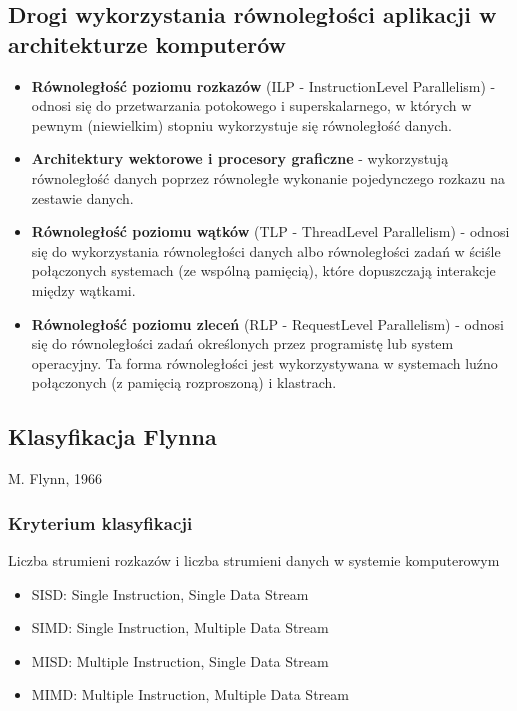 \documentclass[a4paper,twoside]{article}
\begin{document}
		\subsection*{Drogi wykorzystania równoległości aplikacji w architekturze komputerów}
			\begin{itemize}
				\item \textbf{Równoległość poziomu rozkazów} (ILP - InstructionLevel Parallelism) - odnosi się do przetwarzania potokowego i superskalarnego, w których w pewnym (niewielkim) stopniu wykorzystuje się równoległość danych.
				\item \textbf{Architektury wektorowe i procesory graficzne} - wykorzystują równoległość danych poprzez równoległe wykonanie pojedynczego rozkazu na zestawie danych.
				\item \textbf{Równoległość poziomu wątków} (TLP - ThreadLevel Parallelism) - odnosi się do wykorzystania równoległości danych albo równoległości zadań w ściśle połączonych systemach (ze wspólną pamięcią), które dopuszczają interakcje między wątkami.
				\item \textbf{Równoległość poziomu zleceń} (RLP - RequestLevel Parallelism) - odnosi się do równoległości zadań określonych przez programistę lub system operacyjny. Ta forma równoległości jest wykorzystywana w systemach luźno połączonych (z pamięcią rozproszoną) i klastrach.
			\end{itemize}
			
		\subsection*{Klasyfikacja Flynna}
		M. Flynn, 1966
		\subsubsection*{Kryterium klasyfikacji}
		Liczba strumieni rozkazów i liczba strumieni danych w systemie komputerowym
		\begin{itemize}
			\item SISD: Single Instruction, Single Data Stream
			\item SIMD: Single Instruction, Multiple Data Stream
			\item MISD: Multiple Instruction, Single Data Stream
			\item MIMD: Multiple Instruction, Multiple Data Stream
		\end{itemize}
\end{document}
